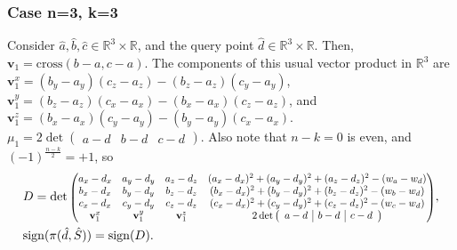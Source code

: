 \documentclass[12pt]{article}
\theoremstyle{definition}
\theoremstyle{remark}
\begin{document}
\subsubsection*{Case n=3, k=3}
Consider $\hat a, \hat b,  \hat c \in \mathbb{R}^3 \times \mathbb{R}$, and the query point $\hat d \in \mathbb{R}^3 \times \mathbb{R}$. Then, $\mathbf{v}_1 = \mathrm{cross}(b-a, c-a)$. The components of this usual vector product in $\mathbb{R}^3$ are $\mathbf{v}_1^x = (b_y-a_y)(c_z-a_z) - (b_z-a_z)(c_y-a_y)$, $\mathbf{v}_1^y = (b_z-a_z)(c_x-a_x) - (b_x-a_x)(c_z-a_z)$, and $\mathbf{v}_1^z = (b_x-a_x)(c_y-a_y) - (b_y-a_y)(c_x-a_x)$. $\mu_1 = 2\det \left( 
\begin{array}{c|c|c}
    a-d & b-d & c-d
\end{array}\right)$. Also note that $n-k=0$ is even, and $(-1)^{\frac{n-k}{2}} = +1$, so 
\begin{align*}
    &D = \det 
    \scalebox{0.82}{$\begin{pmatrix} 
            a_x - d_x & a_y - d_y &a_z - d_z & (a_x-d_x)^2 + (a_y-d_y)^2 + (a_z - d_z)^2 - (w_a - w_d) \\
            b_x - d_x & b_y - d_y &b_z - d_z & (b_x-d_x)^2 + (b_y-d_y)^2 + (b_z - d_z)^2 - (w_b - w_d) \\
            c_x - d_x & c_y - d_y &c_z - d_z & (c_x-d_x)^2 + (c_y-d_y)^2 + (c_z - d_z)^2 - (w_c - w_d) \\
            \mathbf{v}_1^x & \mathbf{v}_1^y & \mathbf{v}_1^z & 2\det \left( 
\begin{array}{c|c|c}
    a-d & b-d & c-d
\end{array}\right)
\end{pmatrix}$},\\
&\mathrm{sign}(\pi(\hat d, \hat S)) =  \mathrm{sign}(D).
\end{align*}
\end{document}
